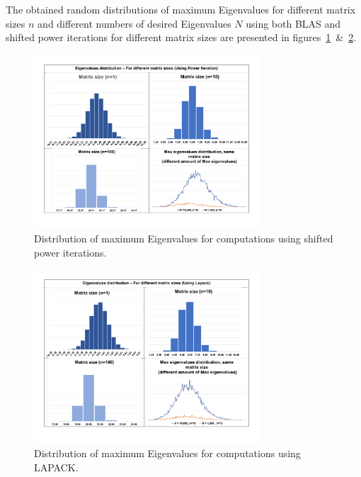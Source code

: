\documentclass[11pt, oneside]{article}
\begin{document}
The obtained random distributions of maximum Eigenvalues for different matrix sizes $n$ and different numbers of desired Eigenvalues $N$ using both BLAS and shifted power iterations for different matrix sizes are presented in figures~\ref{fig:1}~\&~\ref{fig:2}.
        \begin{figure}[h]
		\centering
		\includegraphics[width=0.75\textwidth]{Figures/PM_new.pdf}
		\caption{Distribution of maximum Eigenvalues for computations using shifted power iterations.}
		\label{fig:1}
	\end{figure}
	\begin{figure}[h]
		\centering
		\includegraphics[width=0.75\textwidth]{Figures/Lapack_new.pdf}
		\caption{Distribution of maximum Eigenvalues for computations using LAPACK.}
		\label{fig:2}
	\end{figure}
\end{document}
